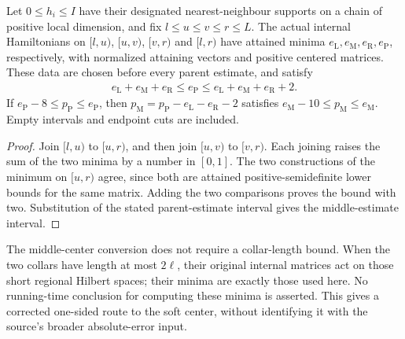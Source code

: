 \begin{lemma}
    \label{lem:regional_central_energy_estimate}
    \leanok
    Let $0\le h_i\le I$ have their designated nearest-neighbour supports
    on a chain of positive local dimension, and fix
    $l\le u\le v\le r\le L$. The actual internal Hamiltonians on
    $[l,u)$, $[u,v)$, $[v,r)$ and $[l,r)$ have attained minima
    $e_{\mathrm L},e_{\mathrm M},e_{\mathrm R},e_{\mathrm P}$, respectively,
    with normalized attaining vectors and positive centered matrices.
    These data are chosen before every parent estimate, and satisfy
    \begin{align}
        e_{\mathrm L}+e_{\mathrm M}+e_{\mathrm R}
        \le e_{\mathrm P}
        \le e_{\mathrm L}+e_{\mathrm M}+e_{\mathrm R}+2.
    \end{align}
    If $e_{\mathrm P}-8\le p_{\mathrm P}\le e_{\mathrm P}$, then
    $p_{\mathrm M}=p_{\mathrm P}-e_{\mathrm L}-e_{\mathrm R}-2$
    satisfies $e_{\mathrm M}-10\le p_{\mathrm M}\le e_{\mathrm M}$.
    Empty intervals and endpoint cuts are included.
\end{lemma}
\begin{proof}\leanok
    Join $[l,u)$ to $[u,r)$, and then join $[u,v)$ to $[v,r)$.
    Each joining raises the sum of the two minima by a number in $[0,1]$.
    The two constructions of the minimum on $[u,r)$ agree, since both
    are attained positive-semidefinite lower bounds for the same matrix.
    Adding the two comparisons proves the bound with two. Substitution
    of the stated parent-estimate interval gives the middle-estimate
    interval.
\end{proof}

The middle-center conversion does not require a collar-length bound.
When the two collars have length at most $2\ell$, their original internal
matrices act on those short regional Hilbert spaces; their minima are
exactly those used here. No running-time conclusion for computing these
minima is asserted. This gives a corrected one-sided route to the soft
center, without identifying it with the source's broader absolute-error
input.
